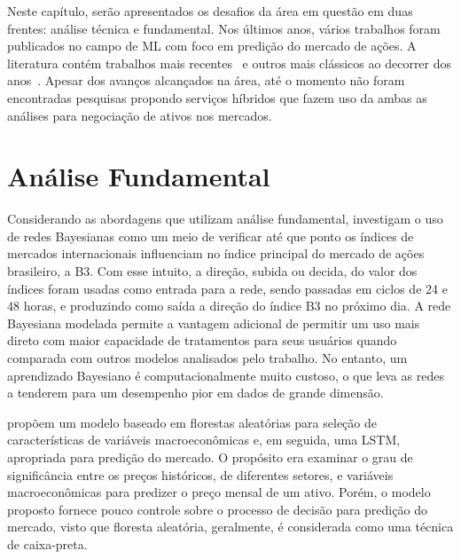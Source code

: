 \label{cap:rwork}

Neste capítulo, serão apresentados os desafios da área em questão em duas frentes: análise técnica e fundamental. Nos últimos anos, vários trabalhos foram publicados no campo de \acrshort{ML} com foco em predição do mercado de ações. A literatura contém trabalhos mais recentes~\cite{fusionportifolio, ga_optimized_lstm, random_forest_macroeconomic, review, airms, forecasting_bayesian, clustering_svm} e outros mais clássicos ao decorrer dos anos~\cite{google_trends, cesarone2011portfolio, predicting_direction_svm,  hybrid_forecasting, gabased_svm, forecasting_returns, nn_forecasting}.  Apesar dos avanços alcançados na área, até o momento não foram encontradas pesquisas propondo serviços híbridos que fazem uso da ambas as análises para negociação de ativos nos mercados.

\section{Análise Fundamental}

Considerando as abordagens que utilizam análise fundamental, \textcite{forecasting_bayesian} investigam o uso de redes Bayesianas como um meio de verificar até que ponto os índices de mercados internacionais influenciam no índice principal do mercado de ações brasileiro, a B3. Com esse intuito, a direção, subida ou decida, do valor dos índices foram usadas como entrada para a rede, sendo passadas em ciclos de 24 e 48 horas, e produzindo como saída a direção do índice B3 no próximo dia. A rede Bayesiana modelada permite a vantagem adicional de permitir um uso mais direto com maior capacidade de tratamentos para seus usuários quando comparada com outros modelos analisados pelo trabalho. No entanto, um aprendizado Bayesiano é computacionalmente muito custoso, o que leva as redes a tenderem para um desempenho pior em dados de grande dimensão.

\textcite{random_forest_macroeconomic} propõem um modelo baseado em florestas aleatórias para seleção de características de variáveis macroeconômicas e, em seguida, uma LSTM, apropriada para predição do mercado. O propósito era examinar o grau de significância entre os preços históricos, de diferentes setores, e variáveis macroeconômicas para predizer o preço mensal de um ativo. Porém, o modelo proposto fornece pouco controle sobre o processo de decisão para predição do mercado, visto que floresta aleatória, geralmente, é considerada como uma técnica de caixa-preta.


